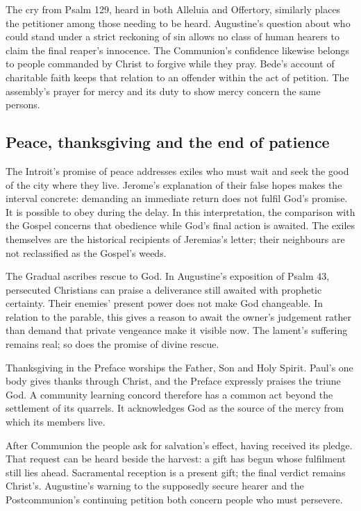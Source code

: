 The cry from Psalm 129, heard in both Alleluia and Offertory, similarly
places the petitioner among those needing to be heard. Augustine's
question about who could stand under a strict reckoning of sin allows
no class of human hearers to claim the final reaper's innocence.
The Communion's confidence likewise belongs to people commanded by
Christ to forgive while they pray. Bede's account of charitable faith
keeps that relation to an offender within the act of petition. The
assembly's prayer for mercy and its duty to show mercy concern the same
persons.

\subsection{Peace, thanksgiving and the end of patience}
The Introit's promise of peace addresses exiles who must wait and seek
the good of the city where they live. Jerome's explanation of their
false hopes makes the interval concrete: demanding an immediate return
does not fulfil God's promise. It is possible to obey during the delay.
In this interpretation, the comparison with the Gospel concerns that
obedience while God's final action is awaited. The exiles themselves
are the historical recipients of Jeremias's letter; their neighbours
are not reclassified as the Gospel's weeds.

The Gradual ascribes rescue to God. In Augustine's exposition of
Psalm 43, persecuted Christians can praise a deliverance still awaited
with prophetic certainty. Their enemies' present power does not make
God changeable. In relation to the parable, this gives a reason to
await the owner's judgement rather than demand that private vengeance
make it visible now. The lament's suffering remains real; so does the
promise of divine rescue.

Thanksgiving in the Preface worships the Father, Son and Holy Spirit.
Paul's one body gives thanks through Christ, and the Preface expressly
praises the triune God. A community learning concord therefore has a
common act beyond the settlement of its quarrels. It acknowledges God
as the source of the mercy from which its members live.

After Communion the people ask for salvation's effect, having received
its pledge. That request can be heard beside the harvest: a gift has
begun whose fulfilment still lies ahead. Sacramental reception is a
present gift; the final verdict remains Christ's. Augustine's warning
to the supposedly secure hearer and the Postcommunion's continuing
petition both concern people who must persevere.


